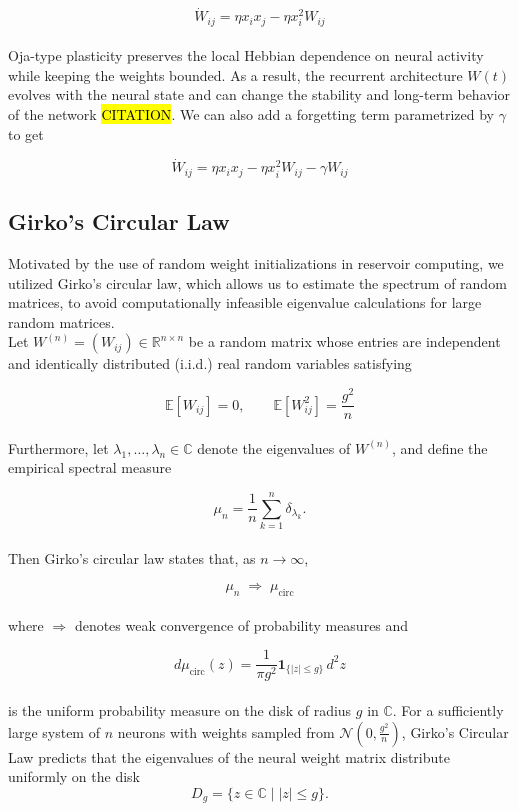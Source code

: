 \documentclass[paper=a4, fontsize=11pt]{scrartcl} %
\numberwithin{equation}{section} %
\numberwithin{figure}{section} %
\numberwithin{table}{section} %
\begin{document}
\begin{equation} \label{3.4}
    \dot W_{ij} = \eta x_i x_j - \eta x_i^2 W_{ij}
\end{equation}
\\
Oja-type plasticity preserves the local Hebbian dependence on neural activity
while keeping the weights bounded. As a result, the recurrent architecture
\(W(t)\) evolves with the neural state and can change the stability and
long-term behavior of the network \hl{CITATION}. We can also add a forgetting term parametrized by $\gamma$ to get

\begin{equation} \label{3.4}
    \dot W_{ij} = \eta x_i x_j - \eta x_i^2 W_{ij} - \gamma W_{ij}
\end{equation}

\subsection{Girko's Circular Law}
Motivated by the use of random weight initializations in reservoir computing, we utilized Girko's circular law, which allows us to estimate the spectrum of random matrices, to avoid computationally infeasible eigenvalue calculations for large random matrices.
\vspace{0.5cm}
\\
Let \(W^{(n)} = (W_{ij}) \in \mathbb{R}^{n \times n}\) be a random matrix whose entries are independent and identically distributed (i.i.d.) real random variables satisfying

\[
\mathbb{E}[W_{ij}] = 0,
\qquad
\mathbb{E}[W_{ij}^2] = \frac{g^2}{n}
\]
\\
Furthermore, let \(\lambda_1,\dots,\lambda_n \in \mathbb{C}\) denote the eigenvalues of \(W^{(n)}\), and define the empirical spectral measure

\[
\mu_n
=
\frac{1}{n}\sum_{k=1}^n \delta_{\lambda_k}.
\]
\\
Then Girko's circular law states that, as \(n \to \infty\),

\[
\mu_n \;\Rightarrow\; \mu_{\mathrm{circ}}
\]
\\
where \(\Rightarrow\) denotes weak convergence of probability measures and

\[
d\mu_{\mathrm{circ}}(z)
=
\frac{1}{\pi g^2}\mathbf{1}_{\{|z|\le g\}}\, d^2 z
\]
\\
is the uniform probability measure on the disk of radius \(g\) in \(\mathbb{C}\). For a sufficiently large system of $n$ neurons with weights sampled from $ \mathcal{N}(0, \frac{g^2}{n})$, Girko's Circular Law predicts that the eigenvalues of the neural weight matrix distribute uniformly on the disk
\[
D_g = \{ z \in \mathbb{C} \mid |z| \le g\}.
\]
\end{document}
